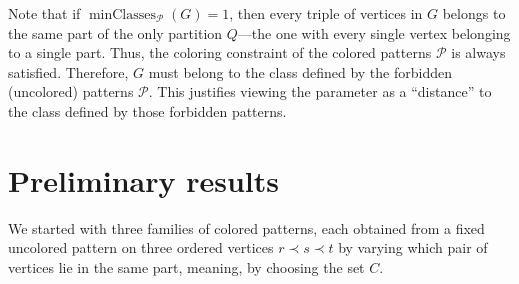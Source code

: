 \documentclass[11pt]{article}
\newcommand{\minClases}{\operatorname{minClasses}}
\newcommand{\eric}[1]{\footnote{\textcolor{blue}{Eric: #1}}}
\theoremstyle{definition}
\theoremstyle{plain}
\theoremstyle{remark}
\begin{document}


Note that if \(\minClases_{\mathcal P}(G)=1\), then every triple of vertices in \(G\) belongs to the same part of the only partition \(Q\)---the one with every single vertex belonging to a single part. Thus, the coloring constraint of the colored patterns \(\mathcal P\) is always satisfied. Therefore, \(G\) must belong to the class defined by the forbidden (uncolored) patterns \(\mathcal P\). This justifies viewing the parameter as a ``distance'' to the class defined by those forbidden patterns.









\section{Preliminary results}

We started with three families of colored patterns, each obtained from a fixed uncolored pattern
on three ordered vertices \(r\prec s\prec t\) by varying which pair of vertices lie in the same part, meaning, by choosing the set \(C\).
\end{document}
